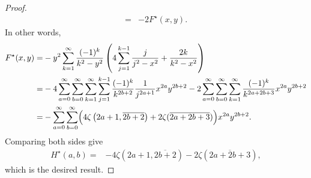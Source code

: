 \documentclass[reqno]{amsart}
\theoremstyle{definition}
\theoremstyle{remark}
\numberwithin{equation}{section}
\begin{document}
\begin{proof}
\begin{align*}
=&-2F^{\star}(x,y).
\end{align*}
In other words,
\begin{align*}
F^{\star}(x,y)
=&-y^2\sum_{k=1}^{\infty} \frac{(-1)^k}{k^2-y^2}\left(4\sum_{j=1}^{k-1}\frac{j}{j^2-x^2}+\frac{2k}{k^2-x^2}\right)\\
=&-4 \sum_{a=0}^{\infty}\sum_{b=0}^{\infty}\sum_{k=1}^{\infty}\sum_{j=1}^{k-1}\frac{(-1)^k}{k^{2b+2}}\frac{1}{j^{2a+1}}x^{2a}y^{2b+2}
-2\sum_{a=0}^{\infty}\sum_{b=0}^{\infty}\sum_{k=1}^{\infty}\frac{(-1)^k}{k^{2a+2b+3}}x^{2a}y^{2b+2}\\
=&-\sum_{a=0}^{\infty}\sum_{b=0}^{\infty}\Bigl(4\zeta\left(2a+1,\overline{2b+2}\right)+2\zeta(\overline{2a+2b+3})\Bigr)x^{2a}y^{2b+2}.
\end{align*}
Comparing both sides give
\begin{align*}
H^{\star}(a, b)=&-4\zeta\left(2a+1,\overline{2b+2}\right)-2\zeta(\overline{2a+2b+3}),
\end{align*}which is the desired result.

\end{proof}
\end{document}
